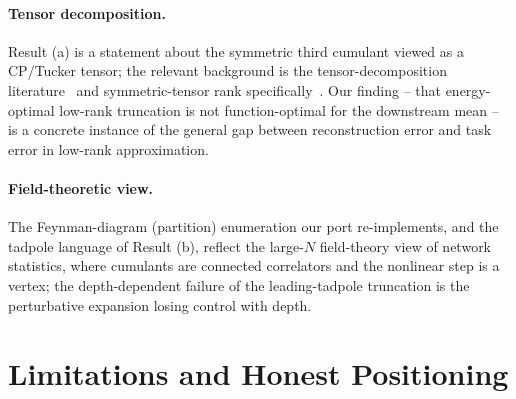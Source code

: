 \documentclass[11pt]{article}
\theoremstyle{remark}
\begin{document}
\paragraph{Tensor decomposition.}
Result (a) is a statement about the symmetric third cumulant viewed as a CP/Tucker
tensor; the relevant background is the tensor-decomposition
literature~\cite{kolda2009tensor} and symmetric-tensor rank
specifically~\cite{comon2008symmetric}. Our finding -- that energy-optimal
low-rank truncation is not function-optimal for the downstream mean -- is a
concrete instance of the general gap between reconstruction error and
task error in low-rank approximation.

\paragraph{Field-theoretic view.}
The Feynman-diagram (partition) enumeration our port re-implements, and the
tadpole language of Result (b), reflect the large-$N$ field-theory view of
network statistics, where cumulants are connected correlators and the
nonlinear step is a vertex; the depth-dependent failure of the leading-tadpole
truncation is the perturbative expansion losing control with depth.

\section{Limitations and Honest Positioning}
\label{sec:limitations}
\end{document}
